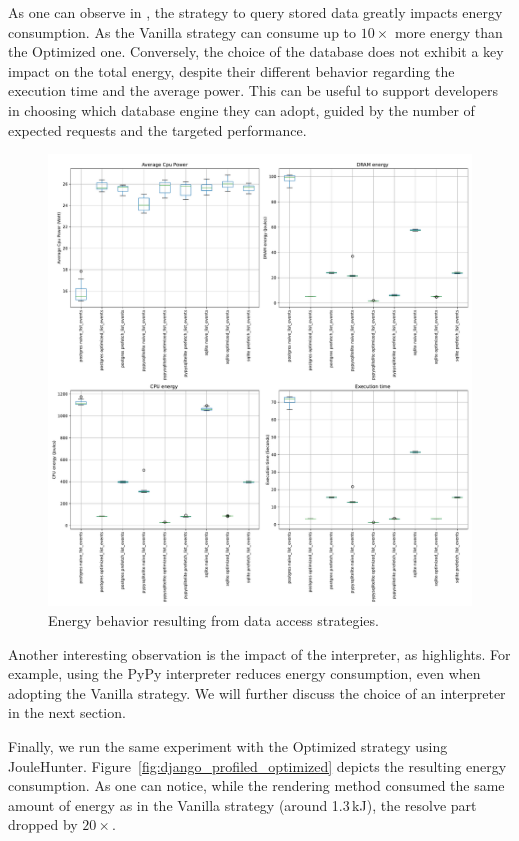 As one can observe in , the strategy to query stored data greatly impacts energy consumption.
As the \textsf{Vanilla} strategy can consume up to $10\times$ more energy than the \textsf{Optimized} one.
Conversely, the choice of the database does not exhibit a key impact on the total energy, despite their different behavior regarding the execution time and the average power.
This can be useful to support developers in choosing which database engine they can adopt, guided by the number of expected requests and the targeted performance.

\begin{figure}[!hbt]
    \centering
    \includegraphics[width=\linewidth]{imgs/django}
    \caption{Energy behavior resulting from data access strategies.}
    \label{fig:django}
\end{figure}

Another interesting observation is the impact of the interpreter, as  highlights.
For example, using the \textsf{PyPy} interpreter reduces energy consumption, even when adopting the \textsf{Vanilla} strategy. We will further discuss the choice of an interpreter in the next section.

Finally, we run the same experiment with the \textsf{Optimized} strategy using JouleHunter.
Figure~\ref{fig:django_profiled_optimized} depicts the resulting energy consumption.
As one can notice, while the rendering method consumed the same amount of energy as in the \textsf{Vanilla} strategy (around 1.3\,kJ), the resolve part dropped by $20\times$.

